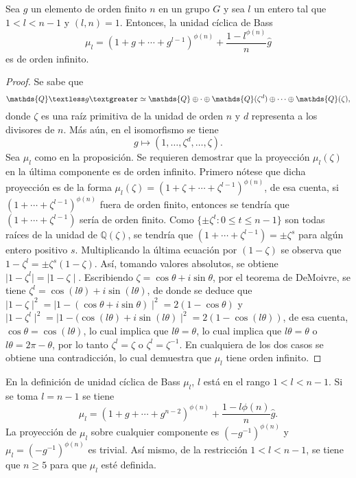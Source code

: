 \begin{proposicion}\label{prop:basscyclic}
Sea $g$ un elemento de orden finito $n$ en un grupo $G$ y sea $l$ un entero tal que $1<l<n-1$ y $(l,n) = 1$. Entonces, la unidad cíclica de Bass \[  \mu_l  = (1+g+\cdots+g^{l-1})^{\phi(n)} + \frac{1-l^{\phi(n)}}{n}\hat{g} \] es de orden infinito. 
\end{proposicion}
\begin{proof}
Se sabe que \[ \mathds{Q}\textless g \textgreater \simeq \mathds{Q} \oplus \cdot \oplus \mathds{Q}(\zeta^d) \oplus \cdots \oplus \mathds{Q}(\zeta),\] donde $\zeta$ es una raíz primitiva de la unidad de orden $n$ y $d$ representa a los divisores de $n$. Más aún, en el isomorfismo se tiene \[ g \mapsto (1, \dots , \zeta^d, \dots , \zeta).\] Sea $\mu_l$ como en la proposición. Se requieren demostrar que la proyección $\mu_l(\zeta)$ en la última componente es de orden infinito. Primero nótese que dicha proyección  es de la forma $\mu_l(\zeta) = (1+\zeta+\cdots+\zeta^{l-1})^{\phi(n)}$, de esa cuenta, si $(1+\cdots + \zeta^{l-1})^{\phi(n)}$ fuera de orden finito, entonces se tendría que $(1+\cdots + \zeta^{l-1})$ sería de orden finito. Como $\{ \pm \zeta^t \colon 0\leq t\leq n-1 \}$ son todas raíces de la unidad de $\mathds{Q}(\zeta)$, se tendría que $(1+\cdots +\zeta^{l-1}) = \pm \zeta^s$ para algún entero positivo $s$. Multiplicando la última ecuación por $(1-\zeta)$ se observa que $1-\zeta^l = \pm \zeta^s(1-\zeta)$. Así, tomando valores absolutos, se obtiene $\mid 1 - \zeta^l \mid = \mid 1-\zeta \mid$. Escribiendo $\zeta = \cos \theta + i \sin \theta$, por el teorema de DeMoivre, se tiene $\zeta^l = \cos(l\theta) + i \sin(l\theta)$, de donde se deduce que $\mid 1 - \zeta \mid^2 = \mid 1 - (\cos\theta + i \sin\theta) \mid ^2 = 2(1-\cos\theta)$ y $\mid 1-\zeta^l \mid^2 = \mid 1-(\cos(l\theta) + i\sin(l\theta)  \mid^2 = 2(1-\cos(l\theta))$, de esa cuenta, $\cos\theta = \cos (l\theta)$, lo cual implica que $l\theta = \theta$, lo cual implica que $l\theta = \theta$ o $l\theta = 2\pi-\theta$, por lo tanto $\zeta^l = \zeta$ o $\zeta^l = \zeta^{-1}$. En cualquiera de los dos casos se obtiene una contradicción, lo cual demuestra que $\mu_l$ tiene orden infinito.
\end{proof}
\begin{nota}
En la definición de unidad cíclica de Bass $\mu_l$, $l$ está en el rango $1<l<n-1$. Si se toma $l=n-1$ se tiene \[ \mu_l= (1+g+\cdots+g^{n-2})^{\phi(n)}+\frac{1-l {\phi(n)}}{n}\hat{g}.\] La proyección de $\mu_l$ sobre cualquier componente es $(-g^{-1})^{\phi(n)}$ y $\mu_l = (-g^{-1})^{\phi(n)}$ es trivial. Así mismo, de la restricción $1<l<n-1$, se tiene que $n\geq 5$ para que $\mu_l$ esté definida.
\end{nota}
